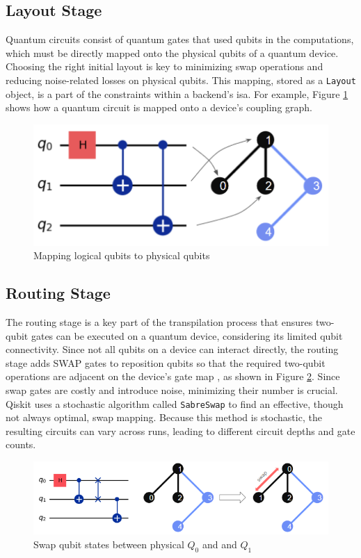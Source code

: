\subsection{Layout Stage} %
Quantum circuits consist of quantum gates that used qubits in the computations, which must be directly mapped onto the physical qubits of a quantum device. Choosing the right initial layout is key to minimizing swap operations and reducing noise-related losses on physical qubits. This mapping, stored as a \lstinline{Layout} object, is a part of the constraints within a backend's \acrfull{isa}. For example, Figure \ref{fig:layout-placement} shows how a quantum circuit is mapped onto a device's coupling graph.
\begin{figure}[h]
    \centering
    \includegraphics[width=0.5\linewidth]{image/layout_placement.png}
    \caption{Mapping logical qubits to physical qubits}
    \label{fig:layout-placement}
\end{figure}

\subsection{Routing Stage} %
The routing stage is a key part of the transpilation process that ensures two-qubit gates can be executed on a quantum device, considering its limited qubit connectivity. Since not all qubits on a device can interact directly, the routing stage adds SWAP gates to reposition qubits so that the required two-qubit operations are adjacent on the device's gate map \cite{wille_mqt_2023}, as shown in Figure \ref{fig:swap-placement}. Since swap gates are costly and introduce noise, minimizing their number is crucial. Qiskit uses a stochastic algorithm called \lstinline{SabreSwap} \cite{li_tackling_2019} to find an effective, though not always optimal, swap mapping. Because this method is stochastic, the resulting circuits can vary across runs, leading to different circuit depths and gate counts. \\
\begin{figure}[htb]
    \centering
    \includegraphics[width=0.7\linewidth]{image/swap_placement.png}
    \caption{Swap qubit states between physical $Q_0$ and and $Q_1$}
    \label{fig:swap-placement}
\end{figure}


